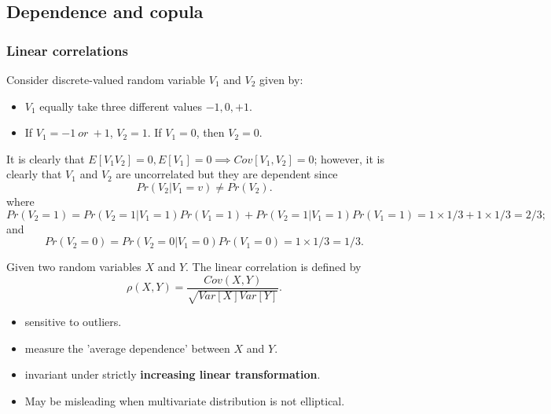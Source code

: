 \begin{refsection}
\begin{definition}[t-copula]
\end{definition}

\subsection{Dependence and copula}

\subsubsection{Linear correlations}

\begin{example}
Consider discrete-valued random variable $V_1$ and $V_2$ given by: 
\begin{itemize}
	\item $V_1$ equally take three different values $-1,0,+ 1$.
	\item If $V_1 = -1 ~or~ + 1$, $V_2 = 1$. If $V_1= 0$, then $V_2 = 0$. 
\end{itemize}

It is clearly that $E[V_1V_2] = 0, E[V_1] = 0 \implies Cov[V_1,V_2] = 0$; however, it is clearly that $V_1$ and $V_2$ are uncorrelated but they are dependent since 
$$Pr(V_2|V_1 = v) \neq Pr(V_2).$$
where $$Pr(V_2 = 1) = Pr(V_2 = 1|V_1 = 1)Pr(V_1 = 1) + Pr(V_2 = 1|V_1 = 1)Pr(V_1 = 1) = 1\times 1/3 + 1\times 1/3 = 2/3;$$
and
$$Pr(V_2 = 0) = Pr(V_2 = 0|V_1 = 0)Pr(V_1 = 0) = 1\times 1/3= 1/3.$$
\end{example}



\begin{definition}\cite[202]{mcneil2015quantitative}
Given two random variables $X$ and $Y$. The linear correlation is defined by	
	$$\rho(X,Y) = \frac{Cov(X,Y)}{\sqrt{Var[X]Var[Y]}}.$$
\end{definition}



\begin{note}\hfill
\begin{itemize}
	\item sensitive to outliers.
	\item measure the 'average dependence' between $X$ and $Y$.
	\item invariant under strictly \textbf{increasing linear transformation}.
	\item May be misleading when multivariate distribution is not elliptical.
\end{itemize}
\end{note}



\end{refsection}

